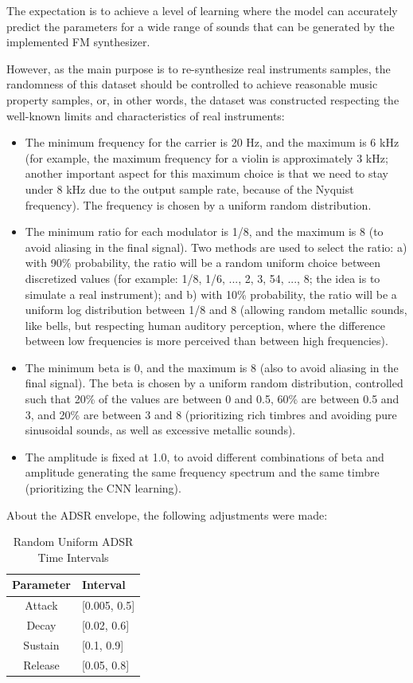 \documentclass[sigconf,natbib=false]{acmart}
\begin{document}
The expectation is to achieve a level of learning where the model can accurately predict the parameters for a wide range of sounds that can be generated by the implemented FM synthesizer.

However, as the main purpose is to re-synthesize real instruments samples, the randomness of this dataset should be controlled to achieve reasonable music property samples, or, in other words, the dataset was constructed respecting the well-known limits and characteristics of real instruments:

\begin{itemize}
    \item The minimum frequency for the carrier is 20 Hz, and the maximum is 6 kHz (for example, the maximum frequency for a violin is approximately 3 kHz; another important aspect for this maximum choice is that we need to stay under 8 kHz due to the output sample rate, because of the Nyquist frequency). The frequency is chosen by a uniform random distribution.
    \item The minimum ratio for each modulator is 1/8, and the maximum is 8 (to avoid aliasing in the final signal). Two methods are used to select the ratio: a) with 90\% probability, the ratio will be a random uniform choice between discretized values (for example: 1/8, 1/6, ..., 2, 3, 54, ..., 8; the idea is to simulate a real instrument); and b) with 10\% probability, the ratio will be a uniform log distribution between 1/8 and 8 (allowing random metallic sounds, like bells, but respecting human auditory perception, where the difference between low frequencies is more perceived than between high frequencies).
    \item The minimum beta is 0, and the maximum is 8 (also to avoid aliasing in the final signal). The beta is chosen by a uniform random distribution, controlled such that 20\% of the values are between 0 and 0.5, 60\% are between 0.5 and 3, and 20\% are between 3 and 8 (prioritizing rich timbres and avoiding pure sinusoidal sounds, as well as excessive metallic sounds).
    \item The amplitude is fixed at 1.0, to avoid different combinations of beta and amplitude generating the same frequency spectrum and the same timbre (prioritizing the CNN learning).
\end{itemize}

About the ADSR envelope, the following adjustments were made:

\begin{table}
  \caption{Random Uniform ADSR Time Intervals}
  \label{tab:time_intervals}
  \begin{tabular}{cl}
    \toprule
    Parameter & Interval \\
    \midrule
    Attack  & [0.005, 0.5] \\
    Decay   & [0.02, 0.6] \\
    Sustain & [0.1, 0.9] \\
    Release & [0.05, 0.8] \\
    \bottomrule
  \end{tabular}
\end{table}
\end{document}
